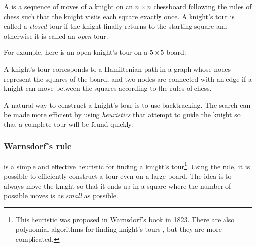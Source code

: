 A  is a sequence of moves
of a knight on an $n \times n$ chessboard
following the rules of chess such that the knight
visits each square exactly once.
A knight's tour is called a \emph{closed} tour
if the knight finally returns to the starting square and
otherwise it is called an \emph{open} tour.

For example, here is an open knight's tour on a $5 \times 5$ board:

\begin{center}
\end{center}

A knight's tour corresponds to a Hamiltonian path in a graph
whose nodes represent the squares of the board,
and two nodes are connected with an edge if a knight
can move between the squares according to the rules of chess.

A natural way to construct a knight's tour is to use backtracking.
The search can be made more efficient by using
\emph{heuristics} that attempt to guide the knight so that
a complete tour will be found quickly.

\subsubsection{Warnsdorf's rule}


 is a simple and effective heuristic
for finding a knight's tour\footnote{This heuristic was proposed
in Warnsdorf's book \cite{war23} in 1823. There are
also polynomial algorithms for finding knight's tours
\cite{par97}, but they are more complicated.}.
Using the rule, it is possible to efficiently construct a tour
even on a large board.
The idea is to always move the knight so that it ends up
in a square where the number of possible moves is as
\emph{small} as possible.

